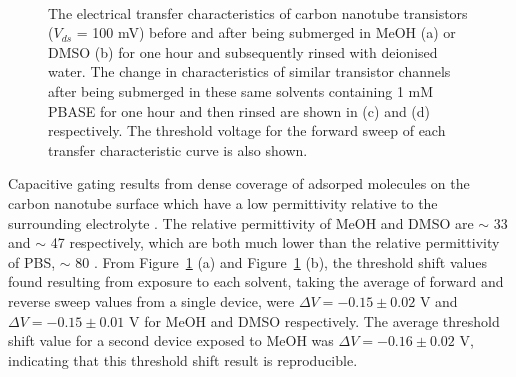 \documentclass[
  a4paper,
]{scrbook}
\begin{document}
\begin{figure}
\begin{minipage}[t]{0.45\linewidth}
{{}

}

\end{minipage}%
%
\begin{minipage}[t]{0.01\linewidth}

{\centering 

~

}

\end{minipage}%

\caption[The electrical transfer characteristics of carbon nanotube
transistors before and after being submerged in MeOH or DMSO for one
hour and subsequently rinsed with deionised water, either with or
without 1 mM PBASE present.]{\label{fig-PBASE-vs-solvent-only}The
electrical transfer characteristics of carbon nanotube transistors
(\(V_{ds}\) = 100 mV) before and after being submerged in MeOH (a) or
DMSO (b) for one hour and subsequently rinsed with deionised water. The
change in characteristics of similar transistor channels after being
submerged in these same solvents containing 1 mM PBASE for one hour and
then rinsed are shown in (c) and (d) respectively. The threshold voltage
for the forward sweep of each transfer characteristic curve is also
shown.}

\end{figure}

Capacitive gating results from dense coverage of adsorped molecules on
the carbon nanotube surface which have a low permittivity relative to
the surrounding electrolyte \autocite{Heller2008}. The relative
permittivity of MeOH and DMSO are \(\sim\) 33 \autocite{Mohsen-Nia2010}
and \(\sim\) 47 \autocite{Hunger2010} respectively, which are both much
lower than the relative permittivity of PBS, \(\sim\) 80
\autocite{Shkodra2021}. From Figure~\ref{fig-PBASE-vs-solvent-only} (a)
and Figure~\ref{fig-PBASE-vs-solvent-only} (b), the threshold shift
values found resulting from exposure to each solvent, taking the average
of forward and reverse sweep values from a single device, were
\(\Delta V = -0.15 \pm 0.02\) V and \(\Delta V = -0.15 \pm 0.01\) V for
MeOH and DMSO respectively. The average threshold shift value for a
second device exposed to MeOH was \(\Delta V = -0.16 \pm 0.02\) V,
indicating that this threshold shift result is reproducible.
\end{document}
